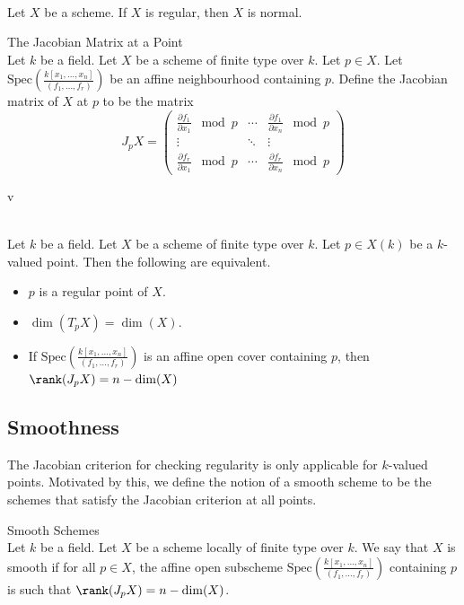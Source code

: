 \documentclass[a4paper]{article}
\begin{document}
\begin{lmm}{}{}\\
Let $X$ be a scheme. If $X$ is regular, then $X$ is normal. 
\end{lmm}

\begin{defn}{The Jacobian Matrix at a Point}{}\\
Let $k$ be a field. Let $X$ be a scheme of finite type over $k$. Let $p\in X$. Let $\text{Spec}\left(\frac{k[x_1,\dots,x_n]}{(f_1,\dots,f_r)}\right)$ be an affine neighbourhood containing $p$. Define the Jacobian matrix of $X$ at $p$ to be the matrix $$J_pX=\begin{pmatrix}
\frac{\partial f_1}{\partial x_1}\;\bmod p & \cdots & \frac{\partial f_1}{\partial x_n}\;\bmod p\\
\vdots & \ddots & \vdots\\
\frac{\partial f_r}{\partial x_1}\;\bmod p & \cdots & \frac{\partial f_r}{\partial x_n}\;\bmod p
\end{pmatrix}$$
\end{defn}
v
\begin{prp}{}{}\\
Let $k$ be a field. Let $X$ be a scheme of finite type over $k$. Let $p\in X(k)$ be a $k$-valued point. Then the following are equivalent. 
\begin{itemize}
\item $p$ is a regular point of $X$. 
\item $\dim(T_pX)=\dim(X)$. 
\item If $\text{Spec}\left(\frac{k[x_1,\dots,x_n]}{(f_1,\dots,f_r)}\right)$ is an affine open cover containing $p$, then $\rank(J_pX)=n-\dim(X)$
\end{itemize}
\end{prp}

\subsection{Smoothness}
The Jacobian criterion for checking regularity is only applicable for $k$-valued points. Motivated by this, we define the notion of a smooth scheme to be the schemes that satisfy the Jacobian criterion at all points. 

\begin{defn}{Smooth Schemes}{}\\
Let $k$ be a field. Let $X$ be a scheme locally of finite type over $k$. We say that $X$ is smooth if for all $p\in X$, the affine open subscheme $\text{Spec}\left(\frac{k[x_1,\dots,x_n]}{(f_1,\dots,f_r)}\right)$ containing $p$ is such that $\rank(J_pX)=n-\dim(X)$. 
\end{defn}
\end{document}
